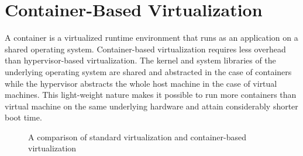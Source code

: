 \section{Container-Based Virtualization}

A container is a virtualized runtime environment that runs as an application on a shared operating system. Container-based virtualization requires less overhead than hypervisor-based virtualization. The kernel and system libraries of the underlying operating system are shared and abstracted in the case of containers while the hypervisor abstracts the whole host machine in the case of virtual machines. This light-weight nature makes it possible to run more containers than virtual machine on the same underlying hardware and attain considerably shorter boot time.

\begin{figure}[h!]
	 \hfill
\caption{A comparison of standard virtualization and container-based virtualization}
\label{request-headers}
\end{figure}

